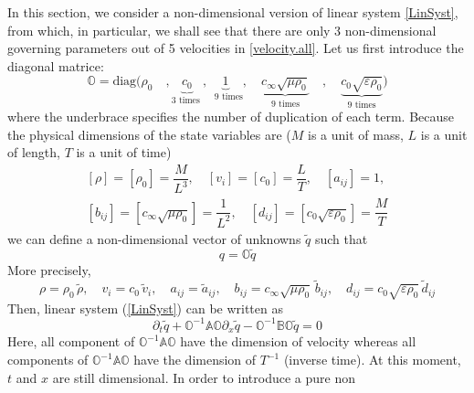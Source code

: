 \documentclass[
10pt, %
a4paper, %
oneside, %
headinclude,footinclude, %
table
]{scrartcl}
\begin{document}
In this section, we consider a non-dimensional version of linear system \eqref{LinSyst}, from 
which, in particular, we shall see that there are only 3 non-dimensional governing parameters out 
of 5 velocities 
in \eqref{velocity.all}. 
Let us first introduce the diagonal matrice:
\begin{equation}
\mathbb{O}=\text{diag}\Big(\rho_{0}\quad,
	\underbrace{c_{0}}_\text{$3$ times },
	\underbrace{1}_\text{ $9$ times}, \quad
	\underbrace{c_{\infty}\sqrt{\mu\rho_{0}}}_{\text{$9$ times}}\quad ,\quad
	\underbrace{c_{0}\sqrt{\varepsilon\rho_{0}}}_{\text{$9$ times}} \Big)
\end{equation}
where the underbrace specifies the number of duplication of each term. Because the physical 
dimensions of the state variables are \cite{PRD-Torsion2019} ($ M $ is a unit of mass, $ L $ is 
a unit of length, $ T $ is a unit of time)
\begin{equation}
	\begin{array}{c}    
		\left[\rho\right]=\left[\rho_{0}\right]=\dfrac{M}{L^3}, \quad
		\left[v_{i}\right]=\left[c_{0}\right]=\dfrac{L}{T}, \quad
		\left[a_{ij}\right]=1,\\[2mm]
		\left[b_{ij}\right]=\left[c_{\infty}\sqrt{\mu\rho_{0}}\right]=\dfrac{1}{L^2}, \quad
		\left[d_{ij}\right]=\left[c_{0}\sqrt{\varepsilon\rho_{0}} \right]=\dfrac{M}{T}
	\end{array}
\end{equation}
we can define a non-dimensional vector of unknowns $\tilde{q}$ such that
\begin{equation}
q=\mathbb{O}\tilde{q}
\end{equation}
More precisely,
\begin{equation}\label{key}
\rho=\rho_{0}\, \tilde{\rho}, \quad
v_{i}=c_{0}\, \tilde{v}_{i}, \quad
a_{ij}=\tilde{a}_{ij}, \quad
b_{ij}=c_{\infty}\sqrt{\mu\rho_{0}}\, \tilde{b}_{ij}, \quad
d_{ij}=c_{0}\sqrt{\varepsilon\rho_{0}}\, \tilde{d}_{ij}
\end{equation}
Then, linear system (\ref{LinSyst}) can be written as 
\begin{equation}
\partial_{t}\tilde{q}+\mathbb{O}^{-1}\mathbb{A}\mathbb{O}\partial_{x}\tilde{q}-\mathbb{O}^{-1}\mathbb{B}\mathbb{O}\tilde{q}=0
\end{equation}
Here, all component of $\mathbb{O}^{-1}\mathbb{A}\mathbb{O}$ have the dimension of velocity whereas 
all components of  $\mathbb{O}^{-1}\mathbb{A}\mathbb{O}$ have the dimension of $T^{-1}$ (inverse 
time). At this moment, $t$ and $x$ are still dimensional. In order to introduce a pure non 
\end{document}

